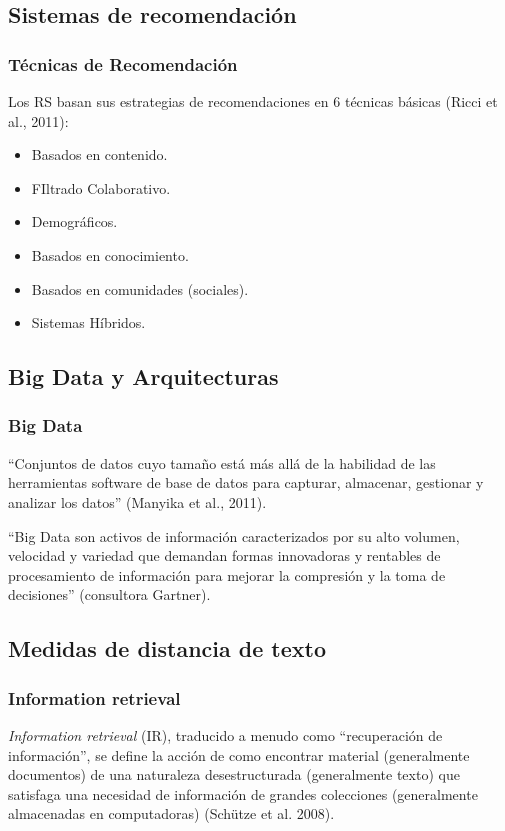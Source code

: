 \subsection{Sistemas de recomendación}
\begin{frame}
	\frametitle{Técnicas de Recomendación}
	Los RS basan sus estrategias de recomendaciones en 6 técnicas básicas (Ricci et al., 2011):
	\bigskip
	\begin{itemize} [<+>]
		\item Basados en contenido.
		\item FIltrado Colaborativo.
		\item Demográficos.
		\item Basados en conocimiento.
		\item Basados en comunidades (sociales).
		\item Sistemas Híbridos.
	\end{itemize}
\end{frame}

\subsection{Big Data y Arquitecturas}
\begin{frame}[allowframebreaks]
	\frametitle{Big Data}
	\begin{tcolorbox}[colback=blue!5,colframe=blue!40!black,title=Big Data]
		``Conjuntos de datos cuyo tamaño está más allá de la habilidad de las herramientas software de base de datos para capturar, almacenar, gestionar y analizar los datos'' (Manyika et al., 2011).

		\bigskip

		``Big Data son activos de información caracterizados por su alto volumen, velocidad y variedad que demandan formas innovadoras y rentables de procesamiento de información para mejorar la compresión y la toma de decisiones'' (consultora Gartner).
	\end{tcolorbox}
\end{frame}

\subsection{Medidas de distancia de texto}
\begin{frame}
	\frametitle{Information retrieval}
	\begin{tcolorbox}[colback=blue!5,colframe=blue!40!black,title=Information retrieval]
		\textit{Information retrieval} (IR), traducido a menudo como ``recuperación de información'', se define la acción de como encontrar material (generalmente documentos) de una naturaleza desestructurada (generalmente texto) que satisfaga una necesidad de información de grandes colecciones (generalmente almacenadas en computadoras) (Schütze et al. 2008).
	\end{tcolorbox}
\end{frame}

